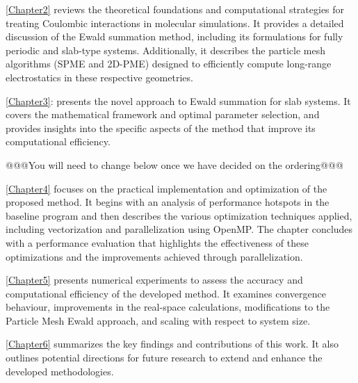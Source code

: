 \autoref{Chapter2} reviews the theoretical foundations and computational strategies for treating Coulombic interactions in molecular simulations. It provides a detailed discussion of the Ewald summation method, including its formulations for fully periodic and slab-type systems. Additionally, it describes the particle mesh algorithms (\acs{SPME} and \acs{2D-PME}) designed to efficiently compute long-range electrostatics in these respective geometries.

\autoref{Chapter3}: presents the novel approach to Ewald summation for slab systems. It covers the mathematical framework and optimal parameter selection, and provides insights into the specific aspects of the method that improve its computational efficiency. 

@@@You will need to change below once we have decided on the ordering@@@

\autoref{Chapter4} focuses on the practical implementation and optimization of the proposed method. It begins with an analysis of performance hotspots in the baseline program and then describes the various optimization techniques applied, including vectorization and parallelization using OpenMP. The chapter concludes with a performance evaluation that highlights the effectiveness of these optimizations and the improvements achieved through parallelization.

\autoref{Chapter5} presents numerical experiments to assess the accuracy and computational efficiency of the developed method. It examines convergence behaviour, improvements in the real-space calculations, modifications to the Particle Mesh Ewald approach, and scaling with respect to system size.

\autoref{Chapter6} summarizes the key findings and contributions of this work. It also outlines potential directions for future research to extend and enhance the developed methodologies.